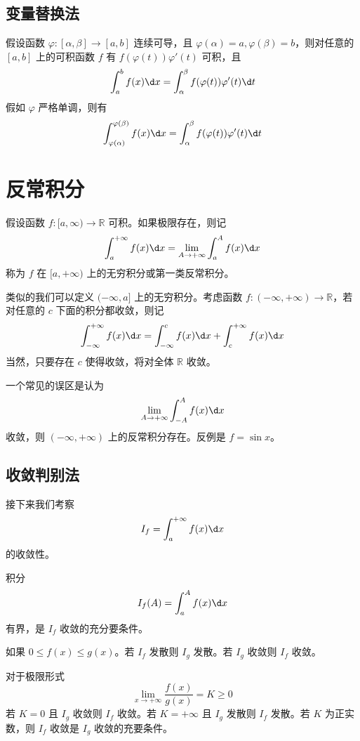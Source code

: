 \subsection{变量替换法}

\begin{theorem}
	假设函数 $\varphi : [\alpha, \beta] \to [a, b]$ 连续可导，且 $\varphi(\alpha) = a, \varphi(\beta) = b$，则对任意的 $[a, b]$ 上的可积函数 $f$ 有 $f(\varphi(t))\varphi'(t)$ 可积，且
	\[ \int_{a}^{b} f(x) \d x = \int_{\alpha}^{\beta} f(\varphi(t)) \varphi'(t) \d t \]
	假如 $\varphi$ 严格单调，则有
	\[ \int_{\varphi(\alpha)}^{\varphi(\beta)} f(x) \d x = \int_{\alpha}^{\beta} f(\varphi(t)) \varphi'(t) \d t \]

\end{theorem}

\section{反常积分}

\begin{definition}
	假设函数 $f : [a, \infty) \to \mathbb{R}$ 可积。如果极限存在，则记
	\[ \int_{a}^{+\infty} f(x) \d x = \lim_{A \to +\infty} \int_{a}^{A} f(x) \d x \]
	称为 $f$ 在 $[a, +\infty)$ 上的无穷积分或第一类反常积分。
\end{definition}

类似的我们可以定义 $(-\infty, a]$ 上的无穷积分。考虑函数 $f : (-\infty, +\infty) \to \mathbb{R}$，若对任意的 $c$ 下面的积分都收敛，则记
\[ \int_{-\infty}^{+\infty} f(x) \d x = \int_{-\infty}^{c} f(x) \d x + \int_{c}^{+\infty}f(x) \d x \]
当然，只要存在 $c$ 使得收敛，将对全体 $\mathbb{R}$ 收敛。

一个常见的误区是认为
\[ \lim_{A \to +\infty} \int_{-A}^{A} f(x) \d x \]
收敛，则 $(-\infty, +\infty)$ 上的反常积分存在。反例是 $f = \sin x$。

\subsection{收敛判别法}

接下来我们考察
\[ I_f = \int_{a}^{+\infty} f(x) \d x \]
的收敛性。

\begin{theorem}[有界判别法]
	积分
	\[ I_f(A) = \int_{a}^{A} f(x) \d x \]
	有界，是 $I_f$ 收敛的充分要条件。
\end{theorem}

\begin{theorem}[比较判别法]
	如果 $0 \leqslant f(x) \leqslant g(x)$。若 $I_f$ 发散则 $I_g$ 发散。若 $I_g$ 收敛则 $I_f$ 收敛。

	对于极限形式
	\[ \lim_{x \to +\infty} \frac{f(x)}{g(x)} = K \geqslant 0 \]
	若 $K = 0$ 且 $I_g$ 收敛则 $I_f$ 收敛。若 $K = +\infty$ 且 $I_g$ 发散则 $I_f$ 发散。若 $K$ 为正实数，则 $I_f$ 收敛是 $I_g$ 收敛的充要条件。
\end{theorem}

